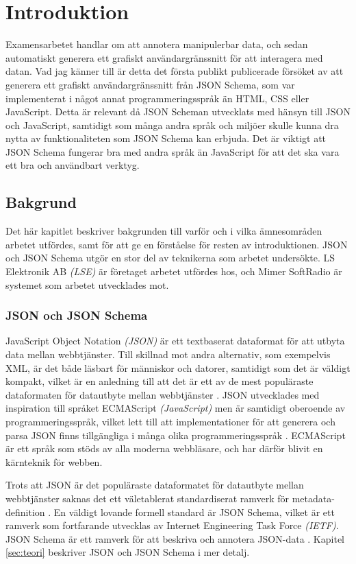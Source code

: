 \chapter{Introduktion}

Examensarbetet handlar om att annotera manipulerbar data, och sedan automatiskt generera ett grafiskt användargränssnitt för att interagera med datan. Vad jag känner till är detta det första publikt publicerade försöket av att generera ett grafiskt användargränssnitt från JSON Schema, som var implementerat i något annat programmeringsspråk än HTML, CSS eller JavaScript. Detta är relevant då JSON Scheman utvecklats med hänsyn till JSON och JavaScript, samtidigt som många andra språk och miljöer skulle kunna dra nytta av funktionaliteten som JSON Schema kan erbjuda. Det är viktigt att JSON Schema fungerar bra med andra språk än JavaScript för att det ska vara ett bra och användbart verktyg.

\section{Bakgrund}
\label{sec:intro:bakgrund}
Det här kapitlet beskriver bakgrunden till varför och i vilka ämnesområden arbetet utfördes, samt för att ge en förståelse för resten av introduktionen. JSON och JSON Schema utgör en stor del av teknikerna som arbetet undersökte. LS Elektronik AB \textit{(LSE)} är företaget arbetet utfördes hos, och Mimer SoftRadio är systemet som arbetet utvecklades mot.

\subsection{JSON och JSON Schema}
\label{sec:intro:json}
JavaScript Object Notation \textit{(JSON)} är ett textbaserat dataformat för att utbyta data mellan webbtjänster. Till skillnad mot andra alternativ, som exempelvis XML, är det både läsbart för människor och datorer, samtidigt som det är väldigt kompakt, vilket är en anledning till att det är ett av de mest populäraste dataformaten för datautbyte mellan webbtjänster \cite{Pezoa2016}. JSON utvecklades med inspiration till språket ECMAScript \textit{(JavaScript)} men är samtidigt oberoende av programmeringsspråk, vilket lett till att implementationer för att generera och parsa JSON finns tillgängliga i många olika programmeringsspråk \cite{ECMA2013}. ECMAScript är ett språk som stöds av alla moderna webbläsare, och har därför blivit en kärnteknik för webben.

Trots att JSON är det populäraste dataformatet för datautbyte mellan webbtjänster saknas det ett väletablerat standardiserat ramverk för metadata-definition \cite[s.~263]{Pezoa2016}. En väldigt lovande formell standard är JSON Schema, vilket är ett ramverk som fortfarande utvecklas av Internet Engineering Task Force \textit{(IETF)}. JSON Schema är ett ramverk för att beskriva och annotera JSON-data \cite{A.Wright}. Kapitel \ref{sec:teori} beskriver JSON och JSON Schema i mer detalj.


